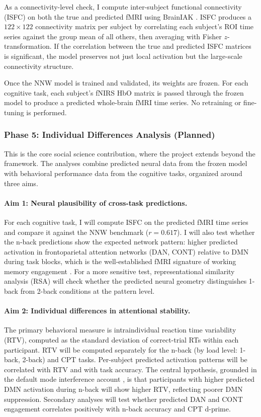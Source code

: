 As a connectivity-level check, I compute inter-subject functional connectivity (ISFC) on both the true and predicted fMRI using BrainIAK \citep{kumar2022}. ISFC produces a $122 \times 122$ connectivity matrix per subject by correlating each subject's ROI time series against the group mean of all others, then averaging with Fisher $z$-transformation. If the correlation between the true and predicted ISFC matrices is significant, the model preserves not just local activation but the large-scale connectivity structure.

Once the NNW model is trained and validated, its weights are frozen. For each cognitive task, each subject's fNIRS HbO matrix is passed through the frozen model to produce a predicted whole-brain fMRI time series. No retraining or fine-tuning is performed.

\subsubsection{Phase 5: Individual Differences Analysis (Planned)}

This is the core social science contribution, where the project extends beyond the \citet{gao2025} framework. The analyses combine predicted neural data from the frozen model with behavioral performance data from the cognitive tasks, organized around three aims.

\paragraph{Aim 1: Neural plausibility of cross-task predictions.} For each cognitive task, I will compute ISFC on the predicted fMRI time series and compare it against the NNW benchmark ($r = 0.617$). I will also test whether the n-back predictions show the expected network pattern: higher predicted activation in frontoparietal attention networks (DAN, CONT) relative to DMN during task blocks, which is the well-established fMRI signature of working memory engagement \citep{owen2005, strangman2002}. For a more sensitive test, representational similarity analysis (RSA) will check whether the predicted neural geometry distinguishes 1-back from 2-back conditions at the pattern level.

\paragraph{Aim 2: Individual differences in attentional stability.} The primary behavioral measure is intraindividual reaction time variability (RTV), computed as the standard deviation of correct-trial RTs within each participant. RTV will be computed separately for the n-back (by load level: 1-back, 2-back) and CPT tasks. Per-subject predicted activation patterns will be correlated with RTV and with task accuracy. The central hypothesis, grounded in the default mode interference account \citep{sonugabarke2007}, is that participants with higher predicted DMN activation during n-back will show higher RTV, reflecting poorer DMN suppression. Secondary analyses will test whether predicted DAN and CONT engagement correlates positively with n-back accuracy and CPT d-prime.

